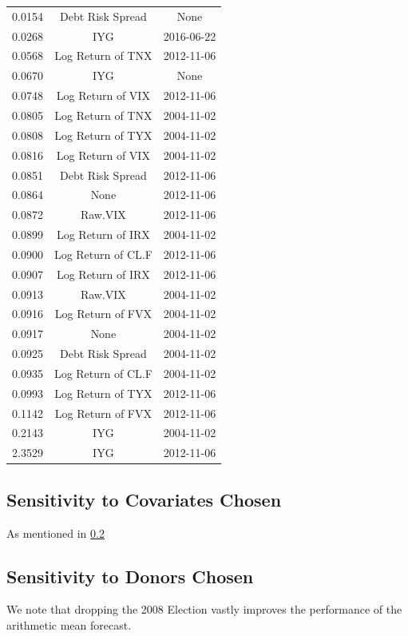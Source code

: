\documentclass[11pt,3p,review,authoryear]{elsarticle}
\theoremstyle{definition}
\begin{document}
\begin{table}[ht]
\begin{tabular}{ccc}
    0.0154 & Debt Risk Spread & None \\ 
    0.0268 & IYG & 2016-06-22 \\ 
    0.0568 & Log Return of TNX & 2012-11-06 \\ 
    0.0670 & IYG & None \\ 
    0.0748 & Log Return of VIX & 2012-11-06 \\ 
    0.0805 & Log Return of TNX & 2004-11-02 \\ 
    0.0808 & Log Return of TYX & 2004-11-02 \\ 
    0.0816 & Log Return of VIX & 2004-11-02 \\ 
    0.0851 & Debt Risk Spread & 2012-11-06 \\ 
    0.0864 & None & 2012-11-06 \\ 
    0.0872 & Raw.VIX & 2012-11-06 \\ 
    0.0899 & Log Return of IRX & 2004-11-02 \\ 
    0.0900 & Log Return of CL.F & 2012-11-06 \\ 
    0.0907 & Log Return of IRX & 2012-11-06 \\ 
    0.0913 & Raw.VIX & 2004-11-02 \\ 
    0.0916 & Log Return of FVX & 2004-11-02 \\ 
    0.0917 & None & 2004-11-02 \\ 
    0.0925 & Debt Risk Spread & 2004-11-02 \\ 
    0.0935 & Log Return of CL.F & 2004-11-02 \\ 
    0.0993 & Log Return of TYX & 2012-11-06 \\ 
    0.1142 & Log Return of FVX & 2012-11-06 \\ 
    0.2143 & IYG & 2004-11-02 \\ 
    2.3529 & IYG & 2012-11-06 \\ 
     \hline
  \end{tabular}
  \endgroup
  \end{table}

\subsection{Sensitivity to Covariates Chosen}
As mentioned in \ref{}

\subsection{Sensitivity to Donors Chosen}

We note that dropping the 2008 Election vastly improves the performance of the arithmetic mean forecast.
\end{document}
